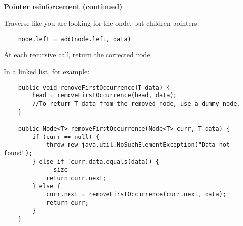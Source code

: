 \documentclass{exam}
\begin{document}
    \noindent\makebox[\linewidth]{\rule{18cm}{0.4pt}}\\
    
    \textbf{Pointer reinforcement (continued)}
    
    Traverse like you are looking for the onde, but children pointers:
    \begin{lstlisting}
    node.left = add(node.left, data)
    \end{lstlisting}
    
    At each recursive call, return the corrected node.
    
    In a linked list, for example:
    
    \begin{lstlisting}
    public void removeFirstOccurrence(T data) {
        head = removeFirstOccurrence(head, data); 
        //To return T data from the removed node, use a dummy node.
    }
    
    public Node<T> removeFirstOccurrence(Node<T> curr, T data) {
        if (curr == null) { 
            throw new java.util.NoSuchElementException("Data not found");
        } else if (curr.data.equals(data)) {
            --size;
            return curr.next;
        } else {
            curr.next = removeFirstOccurrence(curr.next, data);
            return curr;
        }
    }
    \end{lstlisting}
    
    
\end{document}
